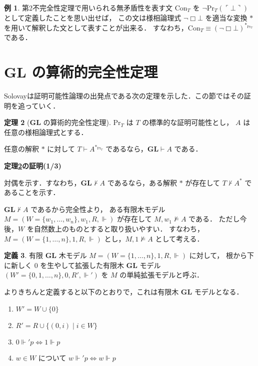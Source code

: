 \documentclass{jsarticle}
\makeatletter
\newcommand*{\Logic}[1]{\mathbf{#1}}
\newcommand*{\LogicGL}{\Logic{GL}}
\newcommand*{\Provable}{\mathrm{Pr}}
\theoremstyle{definition}
\newtheorem{theorem}{定理}[section]
\newtheorem{definition}[theorem]{定義}
\newtheorem{example}[theorem]{例}
\renewcommand{\proofname}{証明}
\renewenvironment{proof}[1][\proofname]{\par
    \normalfont 
    \topsep6\p@\@plus6\p@\relax
    \trivlist
    \item\relax
    {\bfseries\gtfamily
    #1\@addpunct{.}}\hspace\labelsep\ignorespaces
    }{%
    \endtrivlist
    \@endpefalse
}
\makeatother
\begin{document}
\begin{example}
    第2不完全性定理で用いられる無矛盾性を表す文 $\mathrm{Con}_T$ を $\lnot \Provable_T(\ulcorner \bot \urcorner)$ として定義したことを思い出せば，
    この文は様相論理式 $\lnot \Box \bot$ を適当な変換 $*$ を用いて解釈した文として表すことが出来る．
    すなわち，$\mathrm{Con}_T \equiv (\lnot \Box \bot)^{*_{\Provable_T}}$ である．
\end{example}

\section{$\LogicGL$ の算術的完全性定理}

Solovayは証明可能性論理の出発点である次の定理を示した．この節ではその証明を追っていく．

\begin{theorem}[$\LogicGL$ の算術的完全性定理]\label{thm:GL_arith_completeness}
    $\Provable_T$ は $T$ の標準的な証明可能性とし，
    $A$ は任意の様相論理式とする．

    任意の解釈 $*$ に対して $T \vdash A^{*_{\Provable_T}}$ であるなら，$\LogicGL \vdash A$ である．
\end{theorem}

\begin{proof}[定理\ref{thm:GL_arith_completeness}の証明(1/3)]
    対偶を示す．すなわち，$\LogicGL \nvdash A$ であるなら，ある解釈 $*$ が存在して $T \nvdash A^*$ であることを示す．

    $\LogicGL \nvdash A$ であるから完全性より，
    ある有限木モデル $M = (W = \{w_1, \dots, w_n\}, w_1, R, \Vdash)$ が存在して $M,w_1 \nvDash A$ である．
    ただし今後，$W$ を自然数上のものとすると取り扱いやすい．
    すなわち，$M = (W = \{1,\dots,n\}, 1, R, \Vdash)$ とし，$M,1 \nvDash A$ として考える．
\end{proof}

\begin{definition}
    有限 $\LogicGL$ 木モデル $M = (W = \{1,\dots,n\}, 1, R, \Vdash)$ に対して，
    根から下に新しく $0$ を生やして拡張した有限木 $\LogicGL$ モデル $(W' = \{0,1,\dots,n\}, 0, R', \Vdash')$ を $M$ の単純拡張モデルと呼ぶ．

    よりきちんと定義すると以下のとおりで，これは有限木 $\LogicGL$ モデルとなる．
    \begin{enumerate}
        \item $W' = W \cup \{0\}$
        \item $R' = R \cup \{(0,i) \mid i \in W\}$
        \item $0 \Vdash' p \iff 1 \Vdash p$
        \item $w \in W$ について $w \Vdash' p \iff w \Vdash p$
    \end{enumerate}
\end{definition}
\end{document}
